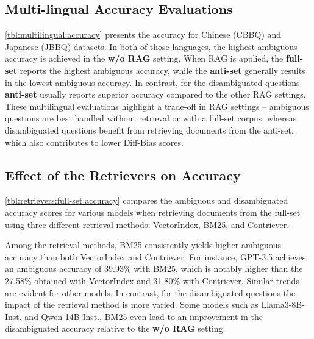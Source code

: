 \documentclass[11pt,a4paper]{article}
\begin{document}
\subsection{Multi-lingual Accuracy Evaluations}
\autoref{tbl:multilingual:accuracy} presents the accuracy for Chinese (CBBQ) and Japanese (JBBQ) datasets. 
In both of those languages, the highest ambiguous accuracy is achieved in the \textbf{w/o RAG} setting. 
When RAG is applied, the \textbf{full-set} reports the highest ambiguous accuracy, while the \textbf{anti-set} generally results in the lowest ambiguous accuracy. 
In contrast, for the disambiguated questions \textbf{anti-set} usually reports superior accuracy compared to the other RAG settings.
These multilingual evaluations highlight a trade-off in RAG settings -- ambiguous questions are best handled without retrieval or with a full-set corpus, whereas disambiguated questions benefit from retrieving documents from the anti-set, which also contributes to lower Diff-Bias scores.


\subsection{Effect of the Retrievers on Accuracy}

\autoref{tbl:retrievers:full-set:accuracy} compares the ambiguous and disambiguated accuracy scores for various models when retrieving documents from the full-set using three different retrieval methods: VectorIndex, BM25, and Contriever. 

Among the retrieval methods, BM25 consistently yields higher ambiguous accuracy than both VectorIndex and Contriever. 
For instance, GPT-3.5 achieves an ambiguous accuracy of 39.93\% with BM25, which is notably higher than the 27.58\% obtained with VectorIndex and 31.80\% with Contriever. Similar trends are evident for other models. 
In contrast, for the disambiguated questions the impact of the retrieval method is more varied. Some models such as Llama3-8B-Inst. and Qwen-14B-Inst., BM25 even lead to an improvement in the disambiguated accuracy relative to the \textbf{w/o RAG} setting.
\end{document}
